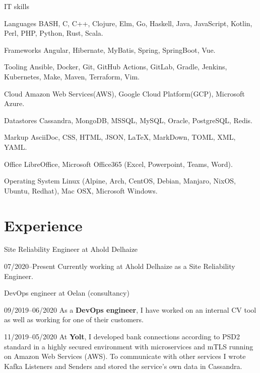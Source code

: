 \documentclass[11pt,a4paper]{article}
\begin{document}
\begin{cv}{}
	\vspace{.5em}

	\begin{cvlist}{IT skills}
		\item[Languages] BASH, C, C++, Clojure, Elm, Go, Haskell, Java, JavaScript,
		Kotlin, Perl, PHP, Python, Rust, Scala.
		\item[Frameworks] Angular, Hibernate, MyBatis, Spring, SpringBoot, Vue.
		\item[Tooling] Ansible, Docker, Git, GitHub Actions, GitLab, Gradle,
		Jenkins, Kubernetes, Make, Maven, Terraform, Vim.
		\item[Cloud] Amazon Web Services(AWS), Google Cloud Platform(GCP),
		Microsoft Azure.
		\item[Datastores] Cassandra, MongoDB, MSSQL, MySQL, Oracle, PostgreSQL,
		Redis.
		\item[Markup] AsciiDoc, CSS, HTML, JSON, {\LaTeX}, MarkDown, TOML, XML, YAML.
		\item[Office] LibreOffice, Microsoft Office365 (Excel, Powerpoint, Teams, Word).
		\item[Operating System] Linux (Alpine, Arch, CentOS, Debian, Manjaro,
		NixOS, Ubuntu, Redhat), Mac OSX, Microsoft Windows.
	\end{cvlist}

	\newpage

	\section{Experience}

	\begin{cvlist}{Site Reliability Engineer at Ahold Delhaize}
		\item[07/2020--Present] Currently working at Ahold Delhaize as a Site
		Reliability Engineer.
	\end{cvlist}

	\begin{cvlist}{DevOps engineer at Oelan (consultancy)}
		\item[09/2019--06/2020] As a \textbf{DevOps engineer}, I have worked on an
		internal CV tool as well as working for one of their customers.
		\item[\color{gray}11/2019--05/2020] At \textbf{Yolt}, I developed bank
		connections according to PSD2 standard in a highly secured environment with
		microservices and mTLS running on Amazon Web Services (AWS). To communicate
		with other services I wrote Kafka Listeners and Senders and stored the
		service's own data in Cassandra.
	\end{cvlist}


\end{cv}
\end{document}
